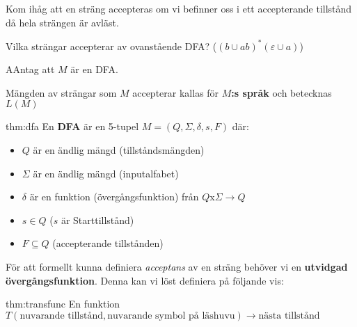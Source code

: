 \par\bigskip
\noindent Kom ihåg att en sträng accepteras om vi befinner oss i ett accepterande tillstånd då hela strängen är avläst.\par
\noindent Vilka strängar accepterar av ovanstående DFA? ($(b\cup ab)^*(\varepsilon\cup a)$)
\par\bigskip
\begin{theo}
  AAntag att $M$ är en DFA.\par
  \noindent Mängden av strängar som $M$ accepterar kallas för \textbf{$M$:s språk} och betecknas $L(M)$
\end{theo}
\par\bigskip
\begin{theo}{thm:dfa}
  En \textbf{DFA} är en 5-tupel $M = (Q,\Sigma,\delta,s,F)$ där:\par
  \begin{itemize}
    \item $Q$ är en ändlig mängd (tillståndsmängden)
    \item $\Sigma$ är en ändlig mängd (inputalfabet)
    \item $\delta$ är en funktion (övergångsfunktion) från $Q$x$\Sigma\to Q$
    \item $s\in Q$ ($s$ är Starttillstånd)
    \item $F\subseteq Q$ (accepterande tillstånden)
  \end{itemize}
\end{theo}
\par\bigskip
\noindent För att formellt kunna definiera \textit{acceptans} av en sträng behöver vi en \textbf{utvidgad övergångsfunktion}. Denna kan vi löst definiera på följande vis:
\par\bigskip
\begin{theo}{thm:transfunc}
  En funktion $T(\text{nuvarande tillstånd}, \text{nuvarande symbol på läshuvu})\to\text{nästa tillstånd}$
\end{theo}
\newpage
